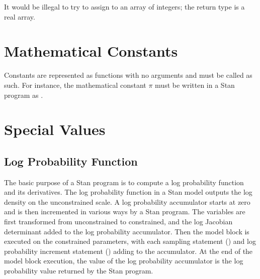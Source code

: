 \begin{description}
\begin{description}
\begin{description}
\begin{description}
It would be illegal to try to assign  to an array of integers; the return type is a real array.

\section{Mathematical Constants}

Constants are represented as functions with no arguments and must be called as such.  For instance, the mathematical constant $\pi$ must be written in a Stan program as .

\begin{description} %

\section{Special Values}

\begin{description}  %



\section{Log Probability Function}

The basic purpose of a Stan program is to compute a log probability function and its derivatives.  The log probability function in a Stan model outputs the log density on the unconstrained scale.  A log probability accumulator starts at zero and is then incremented in various ways by a Stan program.  The variables are first transformed from unconstrained to constrained, and the log Jacobian determinant added to the log probability accumulator.  Then the model block is executed on the constrained parameters, with each sampling statement (\code{~}) and log probability increment statement () adding to the accumulator.  At the end of the model block execution, the value of the log probability accumulator is the log probability value returned by the Stan program.


\end{description}
\end{description}
\end{description}
\end{description}
\end{description}
\end{description}
